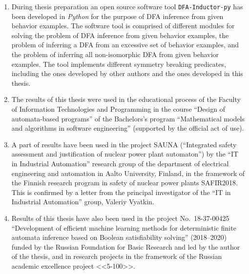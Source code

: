\begin{enumerate}
  \item During thesis preparation an open source software tool \texttt{DFA-Inductor-py} has been developed in \emph{Python} for the purpose of DFA inference from given behavior examples.
  The software tool is comprised of different modules for solving the problem of DFA inference from given behavior examples, the problem of inferring a DFA from an excessive set of behavior examples, and the problem of inferring all non-isomorphic DFA from given behavior examples.
  The tool implements different symmetry breaking predicates, including the ones developed by other authors and the ones developed in this thesis.

  \item The results of this thesis were used in the educational process of the Faculty of Information Technologies and Programming in the course ``Design of automata-based programs'' of the Bachelors's program ``Mathematical models and algorithms in software engineering'' (supported by the official act of use).

  \item A part of results have been used in the project SAUNA (``Integrated safety assessment and justification of nuclear power plant automaton'') by the ``IT in Industrial Automation'' research group of the department of electrical engineering and automation in Aalto University, Finland, in the framework of the Finnish research program in safety of nuclear power plants SAFIR2018.  This is confirmed by a letter from the principal investigator of the “IT in Industrial Automation” group, Valeriy Vyatkin.

  \item Results of this thesis have also been used in the project No.~18-37-00425 ``Development of efficient machine learning methods for deterministic finite automata inference based on Boolean satisfiability solving'' (2018--2020) funded by the Russian Foundation for Basic Research and led by the author of the thesis, and in research projects in the framework of the Russian academic excellence project <<5-100>>.
\end{enumerate}


